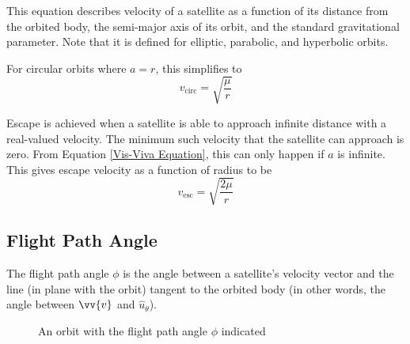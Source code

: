 \documentclass{article}
\begin{document}
This equation describes velocity of a satellite as a function of its distance from the orbited body, the semi-major axis of its orbit, and the standard gravitational parameter. Note that it is defined for elliptic, parabolic, and hyperbolic orbits.

For circular orbits where $a=r$, this simplifies to
\begin{equation}\label{Circular Velocity}
    v_\text{circ} = \sqrt{\frac{\mu}{r}}
\end{equation}

Escape is achieved when a satellite is able to approach infinite distance with a real-valued velocity. The minimum such velocity that the satellite can approach is zero. From Equation \eqref{Vis-Viva Equation}, this can only happen if $a$ is infinite. This gives escape velocity as a function of radius to be
\begin{equation}\label{Escape velocity}
    v_\text{esc}=\sqrt{\frac{2\mu}{r}}
\end{equation}

\bigskip\bigskip
\subsection{Flight Path Angle}

The flight path angle $\phi$ is the angle between a satellite's velocity vector and the line (in plane with the orbit) tangent to the orbited body (in other words, the angle between $\vv{v}$ and $\hat{u}_\theta$).

\begin{figure}[H]
    \centering
    \caption{An orbit with the flight path angle $\phi$ indicated}
\end{figure}
\end{document}
